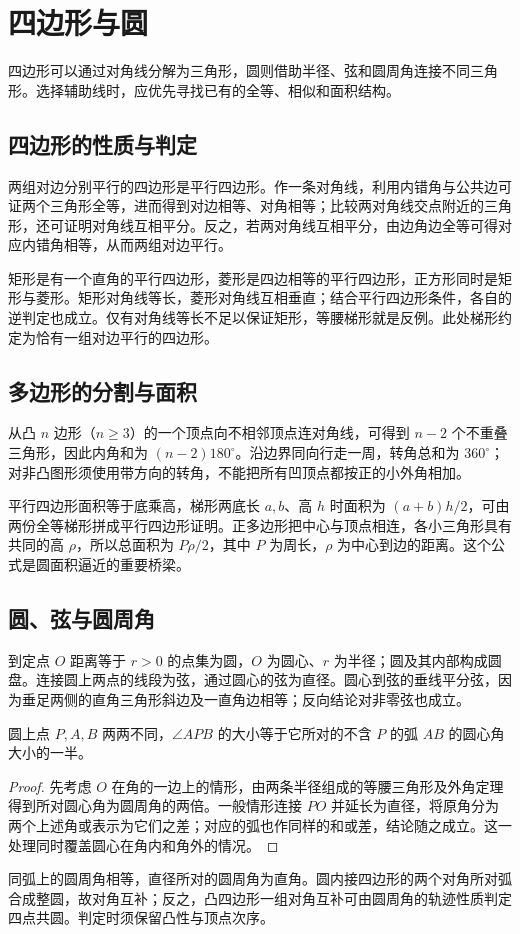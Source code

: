 \setcounter{chapter}{13} %
\chapter{四边形与圆}
\label{chap:em-circles}
四边形可以通过对角线分解为三角形，圆则借助半径、弦和圆周角连接不同三角形。选择辅助线时，应优先寻找已有的全等、相似和面积结构。

\section{四边形的性质与判定}
两组对边分别平行的四边形是平行四边形。作一条对角线，利用内错角与公共边可证两个三角形全等，进而得到对边相等、对角相等；比较两对角线交点附近的三角形，还可证明对角线互相平分。反之，若两对角线互相平分，由边角边全等可得对应内错角相等，从而两组对边平行。

矩形是有一个直角的平行四边形，菱形是四边相等的平行四边形，正方形同时是矩形与菱形。矩形对角线等长，菱形对角线互相垂直；结合平行四边形条件，各自的逆判定也成立。仅有对角线等长不足以保证矩形，等腰梯形就是反例。此处梯形约定为恰有一组对边平行的四边形。

\section{多边形的分割与面积}
从凸 $n$ 边形（$n\ge3$）的一个顶点向不相邻顶点连对角线，可得到 $n-2$ 个不重叠三角形，因此内角和为 $(n-2)180^\circ$。沿边界同向行走一周，转角总和为 $360^\circ$；对非凸图形须使用带方向的转角，不能把所有凹顶点都按正的小外角相加。

平行四边形面积等于底乘高，梯形两底长 $a,b$、高 $h$ 时面积为 $(a+b)h/2$，可由两份全等梯形拼成平行四边形证明。正多边形把中心与顶点相连，各小三角形具有共同的高 $\rho$，所以总面积为 $P\rho/2$，其中 $P$ 为周长，$\rho$ 为中心到边的距离。这个公式是圆面积逼近的重要桥梁。

\section{圆、弦与圆周角}
到定点 $O$ 距离等于 $r>0$ 的点集为圆，$O$ 为圆心、$r$ 为半径；圆及其内部构成圆盘。连接圆上两点的线段为弦，通过圆心的弦为直径。圆心到弦的垂线平分弦，因为垂足两侧的直角三角形斜边及一直角边相等；反向结论对非零弦也成立。

\begin{theorem}[圆周角定理]
圆上点 $P,A,B$ 两两不同，$\angle APB$ 的大小等于它所对的不含 $P$ 的弧 $AB$ 的圆心角大小的一半。
\end{theorem}
\begin{proof}
先考虑 $O$ 在角的一边上的情形，由两条半径组成的等腰三角形及外角定理得到所对圆心角为圆周角的两倍。一般情形连接 $PO$ 并延长为直径，将原角分为两个上述角或表示为它们之差；对应的弧也作同样的和或差，结论随之成立。这一处理同时覆盖圆心在角内和角外的情况。
\end{proof}
同弧上的圆周角相等，直径所对的圆周角为直角。圆内接四边形的两个对角所对弧合成整圆，故对角互补；反之，凸四边形一组对角互补可由圆周角的轨迹性质判定四点共圆。判定时须保留凸性与顶点次序。

